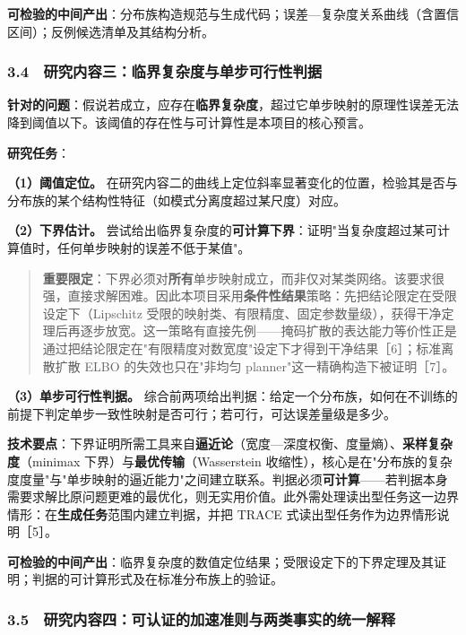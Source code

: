 \documentclass[12pt,a4paper]{ctexart}
\begin{document}
\textbf{可检验的中间产出}：分布族构造规范与生成代码；误差—复杂度关系曲线（含置信区间）；反例候选清单及其结构分析。

\subsubsection*{3.4　研究内容三：临界复杂度与单步可行性判据}

\textbf{针对的问题}：假说若成立，应存在\textbf{临界复杂度}，超过它单步映射的原理性误差无法降到阈值以下。该阈值的存在性与可计算性是本项目的核心预言。

\textbf{研究任务}：

\textbf{（1）阈值定位。} 在研究内容二的曲线上定位斜率显著变化的位置，检验其是否与分布族的某个结构性特征（如模式分离度超过某尺度）对应。

\textbf{（2）下界估计。} 尝试给出临界复杂度的\textbf{可计算下界}：证明"当复杂度超过某可计算值时，任何单步映射的误差不低于某值"。

\begin{quote}\small
\textbf{重要限定}：下界必须对\textbf{所有}单步映射成立，而非仅对某类网络。该要求很强，直接求解困难。因此本项目采用\textbf{条件性结果}策略：先把结论限定在受限设定下（Lipschitz 受限的映射类、有限精度、固定参数量级），获得干净定理后再逐步放宽。这一策略有直接先例——掩码扩散的表达能力等价性正是通过把结论限定在"有限精度对数宽度"设定下才得到干净结果［6］；标准离散扩散 ELBO 的失效也只在"非均匀 planner"这一精确构造下被证明［7］。

\end{quote}

\textbf{（3）单步可行性判据。} 综合前两项给出判据：给定一个分布族，如何在不训练的前提下判定单步一致性映射是否可行；若可行，可达误差量级是多少。

\textbf{技术要点}：下界证明所需工具来自\textbf{逼近论}（宽度—深度权衡、度量熵）、\textbf{采样复杂度}（minimax 下界）与\textbf{最优传输}（Wasserstein 收缩性），核心是在"分布族的复杂度度量"与"单步映射的逼近能力"之间建立联系。判据必须\textbf{可计算}——若判据本身需要求解比原问题更难的最优化，则无实用价值。此外需处理读出型任务这一边界情形：在\textbf{生成任务}范围内建立判据，并把 TRACE 式读出型任务作为边界情形说明［5］。

\textbf{可检验的中间产出}：临界复杂度的数值定位结果；受限设定下的下界定理及其证明；判据的可计算形式及在标准分布族上的验证。

\subsubsection*{3.5　研究内容四：可认证的加速准则与两类事实的统一解释}
\end{document}
